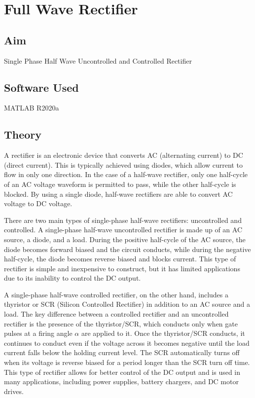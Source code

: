 \chapter{Full Wave Rectifier}
\vspace{-1cm}

\section{Aim}
\hspace{1cm}Single Phase Half Wave Uncontrolled and Controlled Rectifier

\section{Software Used}
\hspace{1cm}MATLAB R2020a
\section{Theory}
\hspace{\parindent}

A rectifier is an electronic device that converts AC (alternating current) to DC (direct current). This is typically achieved using diodes, which allow current to flow in only one direction. In the case of a half-wave rectifier, only one half-cycle of an AC voltage waveform is permitted to pass, while the other half-cycle is blocked. By using a single diode, half-wave rectifiers are able to convert AC voltage to DC voltage.

There are two main types of single-phase half-wave rectifiers: uncontrolled and controlled. A single-phase half-wave uncontrolled rectifier is made up of an AC source, a diode, and a load. During the positive half-cycle of the AC source, the diode becomes forward biased and the circuit conducts, while during the negative half-cycle, the diode becomes reverse biased and blocks current. This type of rectifier is simple and inexpensive to construct, but it has limited applications due to its inability to control the DC output.

A single-phase half-wave controlled rectifier, on the other hand, includes a thyristor or SCR (Silicon Controlled Rectifier) in addition to an AC source and a load. The key difference between a controlled rectifier and an uncontrolled rectifier is the presence of the thyristor/SCR, which conducts only when gate pulses at a firing angle $ \alpha $ are applied to it. Once the thyristor/SCR conducts, it continues to conduct even if the voltage across it becomes negative until the load current falls below the holding current level. The SCR automatically turns off when its voltage is reverse biased for a period longer than the SCR turn off time. This type of rectifier allows for better control of the DC output and is used in many applications, including power supplies, battery chargers, and DC motor drives.

